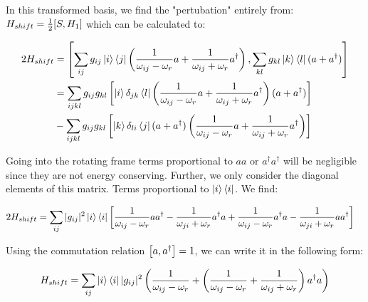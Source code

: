 In this transformed basis, we find the "pertubation" entirely from: $H_{shift} = \frac12 \comm{S}{H_1}$ which can be calculated to:
\begin{fullwidth}
\begin{align*}
    2 H_{shift}&= \comm{\sum_{ij}g_{ij}\ket{i}\bra{j}\left(\frac{1}{\omega_{ij} - \omega_r}a + \frac{1}{\omega_{ij} + \omega_r} a^\dagger \right)}{\sum_{kl} g_{kl} \ket{k}\bra{l} (a + a^\dagger ) } \\
    &= \sum_{ijkl} g_{ij} g_{kl}\left[\ket{i}\delta_{jk}\bra{l}\left(\frac{1}{\omega_{ij} - \omega_r}a + \frac{1}{\omega_{ij} + \omega_r} a^\dagger \right)(a + a^\dagger)\right]\\
    &- \sum_{ijkl} g_{ij} g_{kl}\left[\ket{k} \delta_{li}\bra{j} (a + a^\dagger)\left(\frac{1}{\omega_{ij} - \omega_r}a + \frac{1}{\omega_{ij} + \omega_r} a^\dagger\right)\right]
\end{align*}
\end{fullwidth}
Going into the rotating frame terms proportional to $aa$ or $a^\dagger a^\dagger$ will be negligible since they are not energy conserving. Further, we only consider the diagonal elements of this matrix. Terms proportional to $\ket{i}\bra{i}$. We find: 
\begin{fullwidth}
\begin{align*}
    2 H_{shift} &= \sum_{ij} |g_{ij}|^2 \ket{i}\bra{i} \left[\frac{1}{\omega_{ij} - \omega_r}aa^\dagger - \frac{1}{\omega_{ji} + \omega_r} a^\dagger a + \frac{1}{\omega_{ij} - \omega_r}a^\dagger a - \frac{1}{\omega_{ji} + \omega_r}  a a^\dagger  \right]
\end{align*}
\end{fullwidth}

Using the commutation relation $\comm{a}{a^\dagger} = 1$, we can write it in the following form:
\begin{fullwidth}
\begin{equation}
    H_{shift} = \sum_{ij} \ket{i}\bra{i} |g_{ij}|^2 \left(\frac{1}{\omega_{ij} - \omega_r} + \left(\frac{1}{\omega_{ij} - \omega_r} + \frac{1}{\omega_{ij} + \omega_r} \right)a^\dagger a\right)
\end{equation}
\end{fullwidth}


